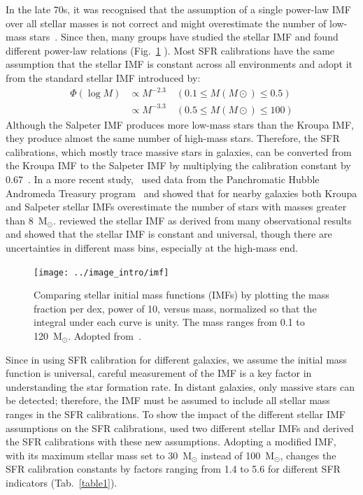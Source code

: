 In the late 70s, it was recognised that the assumption of a single power-law IMF over all stellar masses is not correct and might overestimate the number of low-mass stars~\citep{Kroupa93, Bastin10}. 
Since then, many groups have studied the stellar IMF and found different power-law relations (Fig.~\ref{fig: imf} ). 
Most SFR calibrations have the same assumption that the stellar IMF is constant across all environments and adopt it from the standard stellar IMF introduced by\cite{Kroupa01}:
\begin{equation}
\begin{split}
    \Phi (\log M) & \propto M^{-2.3}    \quad    (0.1 \le M(M{\odot}) \le 0.5)\\                  
           & \propto M^{-3.3}    \quad    (0.5 \le M(M{\odot}) \le 100)
\end{split}
\end{equation}
Although the Salpeter IMF produces more low-mass stars than the Kroupa IMF, they produce almost the same number of high-mass stars. 
Therefore, the SFR calibrations, which mostly trace massive stars in galaxies, can be converted from the Kroupa IMF  to the Salpeter IMF by multiplying the calibration constant by 0.67~\citep{Madau14}.
In a more recent study,~\cite{Weisz15} used data from the Panchromatic Hubble Andromeda Treasury program~\citep[PHAT][]{Dalcanton12} and showed that for nearby galaxies both Kroupa and Salpeter stellar IMFs overestimate the number of stars with masses greater than 8~M$_\odot$.
\cite{Bastin10} reviewed the stellar IMF as derived from many observational results and showed that the stellar IMF is constant and universal, though there are uncertainties in different mass bins, especially at the high-mass end. 

\begin{figure}
\label{fig: imf}
\centering
\texttt{[image: ../image\_intro/imf]}
\small
\caption{Comparing stellar initial mass functions (IMFs) by plotting the mass fraction per dex, power of 10, versus mass, normalized so that the integral under each curve is unity. The mass ranges from 0.1 to 120~M$_\odot$. Adopted from~\cite{Baldry03}.} 
\end{figure}


Since in using SFR calibration for different galaxies, we assume the initial mass function is universal, careful measurement of the IMF is a key factor in understanding the star formation rate. 
In distant galaxies, only massive stars can be detected; therefore, the IMF must be assumed to include all stellar mass ranges in the SFR calibrations. 
To show the impact of the different stellar IMF assumptions on the SFR calibrations, \cite{Calzetti13} used two different stellar IMFs and derived the SFR calibrations with these new assumptions.
Adopting a modified \cite{Kroupa01} IMF, with its maximum stellar mass set to 30~M$_{\odot}$ instead of 100~M$_{\odot}$, changes the SFR calibration constants by factors ranging from 1.4 to 5.6 for different SFR indicators (Tab.~\ref{table1}). 

